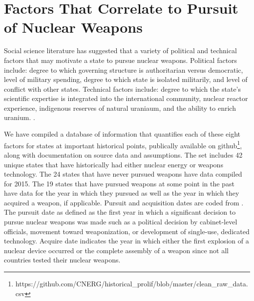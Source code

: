 \section{Factors That Correlate to Pursuit of Nuclear Weapons}
\label{s_factors}

Social science literature has suggested that a variety of political and technical factors that may motivate a state to pursue nuclear weapons. Political factors include: degree to which governing structure is authoritarian versus democratic, level of military spending, degree to which state is isolated militarily, and level of conflict with other states. Technical factors include: degree to which the state's scientific expertise is integrated into the international community, nuclear reactor experience, indigenous reserves of natural uraniaum, and the ability to enrich uranium\cite{hymans_2012}.  .

We have compiled a database of information that quantifies each of these eight factors for states at important historical points, publically available on github\footnote{https://github.com/CNERG/historical\_prolif/blob/master/clean\_raw\_data.csv}, along with documentation on source data and assumptions.  The set includes 42 unique states that have historically had either nuclear energy or weapons technology.  The 24 states that have never pursued weapons have data compiled for 2015. The 19 states that have pursued weapons at some point in the past have data for the year in which they pursued as well as the year in which they acquired a weapon, if applicable. Pursuit and acquisition dates are coded from . The pursuit date as defined as the first year in which a significant decision to pursue nuclear weapons was made such as a political decision by cabinet-level officials, movement toward weaponization, or development of single-use, dedicated technology.  Acquire date indicates the year in which either the first explosion of a nuclear device occurred or the complete assembly of a weapon since not all countries tested their nuclear weapons.

